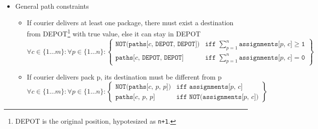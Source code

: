 \begin{itemize}
    \item General path constraints
    \begin{itemize}
        \item If courier delivers at least one package, there must exist a destination from DEPOT\footnote{DEPOT is the original position, hypotesized as \texttt{n+1}.} with true value, else it can stay in DEPOT
        \begin{equation}
            \label{eq:gen_path_constr1}
            \forall c \in \{1 \ldots m\}:
            \forall p \in \{1 \ldots n\}:
            \left\{
                \begin{array}{lr}
                    \texttt{NOT(paths[$c$, DEPOT, DEPOT])} & \texttt{iff } \sum_{p=1}^{n} \texttt{assignments[$p$, $c$]} \geq \texttt{1}\\
                    \texttt{paths[$c$, DEPOT, DEPOT]} & \texttt{iff } \sum_{p=1}^{n} \texttt{assignments[$p$, $c$]} = \texttt{0} %
                \end{array}
            \right\}
        \end{equation}

        \item If courier delivers pack p, its destination must be different from p 
        \begin{equation}
            \label{eq:gen_path_constr2}
            \forall c \in \{1 \ldots m\}:
            \forall p \in \{1 \ldots n\}:
            \left\{
                \begin{array}{lr}
                    \texttt{NOT(paths[$c$, $p$, $p$])} & \texttt{iff } \texttt{assignments[$p$, $c$]}\\
                    \texttt{paths[$c$, $p$, $p$]} & \texttt{iff } \texttt{NOT(assignments[$p$, $c$])} %
                \end{array}
            \right\}
        \end{equation}


\end{itemize}
\end{itemize}
